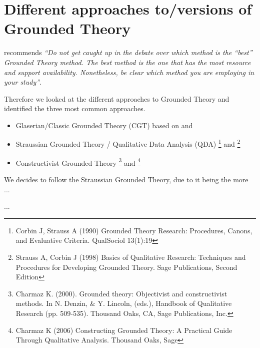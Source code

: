 \section{Different approaches to/versions of Grounded Theory}
\citet{Adolph-2011-GroundedTheory} recommends \textit{“Do not get caught up in the debate over which method is the “best” Grounded Theory method. The best method is the one that has the most resource and support availability. Nonetheless, be clear which method you are employing in your study”}.

Therefore we looked at the different approaches to Grounded Theory and identified the three most common approaches.
\begin{itemize}
	\item Glaserian/Classic Grounded Theory (CGT) based on \citet{Glaser-1967-GroundedTheory} and \citet{Glaser-1978-GroundedTheory}
	
	
	\item Straussian Grounded Theory / Qualitative Data Analysis (QDA)
	\footnote{Corbin J, Strauss A (1990) Grounded Theory Research: Procedures, Canons, and Evaluative Criteria. QualSociol 13(1):19}
	 and 
	 \footnote{Strauss A, Corbin J (1998) Basics of Qualitative Research: Techniques and Procedures for Developing  Grounded Theory. Sage Publications, Second Edition}
	
	\item Constructivist Grounded Theory
	\footnote{Charmaz K. (2000). Grounded theory: Objectivist and constructivist methods. In N. Denzin,  \& Y. Lincoln, (eds.), Handbook of Qualitative Research (pp. 509-535). Thousand Oaks, CA, Sage Publications, Inc.}
	 and 
	\footnote{Charmaz K (2006) Constructing Grounded Theory: A Practical Guide Through Qualitative Analysis. Thousand Oaks, Sage}
\end{itemize}

We decides to follow the Straussian Grounded Theory, due to it being the more ...

...






